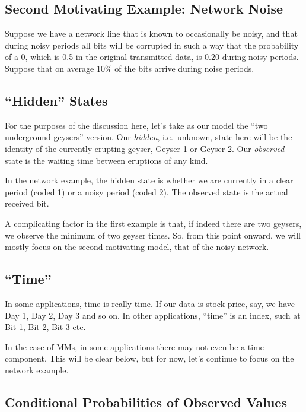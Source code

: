 \documentclass[11pt]{article}
\begin{document}
\subsection{Second Motivating Example:  Network Noise}

Suppose we have a network line that is known to occasionally be
noisy, and that during noisy periods all bits will be corrupted in such
a way that the probability of a 0, which is 0.5 in the original
transmitted data, is 0.20 during noisy periods.  Suppose that on average
10\% of the bits arrive during noise periods.

\subsection{``Hidden'' States}

For the purposes of the discussion here, let's take as our model the
``two underground geysers'' version.  Our \textit{hidden}, i.e.\ unknown, state
here will be the identity of the currently erupting geyser, Geyser 1 or
Geyser 2.  Our \textit{observed} state is the waiting time between
eruptions of any kind.

In the network example, the hidden state is whether we are currently in
a clear period (coded 1) or a noisy period (coded 2).  The observed
state is the actual received bit.

A complicating factor in the first example is that, if indeed there are
two geysers, we observe the minimum of two geyser times.  So, from this
point onward, we will mostly focus on the second motivating model, that
of the noisy network.

\subsection{``Time''}

In some applications, time is really time.  If our data is stock price,
say, we have Day 1, Day 2, Day 3 and so on.  In other applications,
``time'' is an index, such at Bit 1, Bit 2, Bit 3 etc.

In the case of MMs, in some applications there may not even be a time
component.  This will be clear below, but for now, let's continue to
focus on the network example. 

\subsection{Conditional Probabilities of Observed Values}
\end{document}
